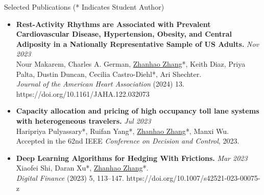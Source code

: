 \documentclass{resume} %
\begin{document}
\begin{rSection}{Selected Publications ({* Indicates Student Author})}
\begin{itemize}
\item {\bf Rest-Activity Rhythms are Associated with Prevalent Cardiovascular Disease, Hypertension, Obesity, and Central Adiposity in a Nationally Representative Sample of US Adults.} \hfill {\em Nov 2023}\\
Nour Makarem, Charles A. German, \underline{Zhanhao Zhang}*, Keith Diaz, Priya Palta, Dustin Duncan, Cecilia Castro-Diehl*, Ari Shechter.\\
\textit{Journal of the American Heart Association} (2024) 13. https://doi.org/10.1161/JAHA.122.032073
\item {\bf Capacity allocation and pricing of high occupancy toll lane systems with heterogeneous travelers.} \hfill {\em Jul 2023}\\
Haripriya Pulyassary*, Ruifan Yang*, \underline{Zhanhao Zhang}*, Manxi Wu.\\
Accepted in the 62nd IEEE \textit{Conference on Decision and Control}, 2023.
\item {\bf Deep Learning Algorithms for Hedging With Frictions.} \hfill {\em Mar 2023}\\
Xiaofei Shi, Daran Xu*, \underline{Zhanhao Zhang}*.\\
\textit{Digital Finance} (2023) 5, 113–147. https://doi.org/10.1007/s42521-023-00075-z
\end{itemize}
\end{rSection}
\end{document}

